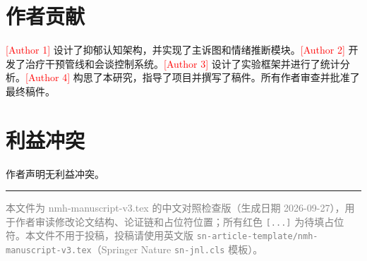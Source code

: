 \documentclass[11pt,a4paper]{article}
\newcommand{\ph}[1]{\textcolor{red}{[#1]}}
\begin{document}
\section*{作者贡献}

\ph{Author 1} 设计了抑郁认知架构，并实现了主诉图和情绪推断模块。\ph{Author 2} 开发了治疗干预管线和会谈控制系统。\ph{Author 3} 设计了实验框架并进行了统计分析。\ph{Author 4} 构思了本研究，指导了项目并撰写了稿件。所有作者审查并批准了最终稿件。

\section*{利益冲突}

作者声明无利益冲突。

\renewcommand{\refname}{参考文献}



\vspace{1em}
\hrule
\vspace{0.5em}
\noindent\small\textcolor{gray}{本文件为 nmh-manuscript-v3.tex 的中文对照检查版（生成日期 2026-09-27），用于作者审读修改论文结构、论证链和占位符位置；所有红色 \texttt{[...]} 为待填占位符。本文件不用于投稿，投稿请使用英文版 \texttt{sn-article-template/nmh-manuscript-v3.tex}（Springer Nature \texttt{sn-jnl.cls} 模板）。}
\end{document}
